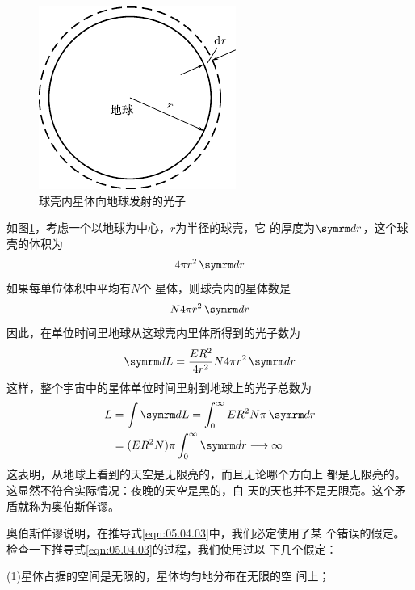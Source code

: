 \begin{figure}
    \centering
    \vspace{-2.5em}
    \includegraphics{figure/fig05.03}
    \caption{球壳内星体向地球发射的光子}
    \label{fig:05.03}
\end{figure}
如图\ref{fig:05.03}，考虑一个以地球为中心，$ r $为半径的球壳，它
的厚度为$ \dif r $，这个球壳的体积为
\begin{equation*}
    4 \pi r ^ { 2 } \dif r
\end{equation*}%
如果每单位体积中平均有$ N $个
星体，则球壳内的星体数是
\begin{equation}\label{eqn:05.04.02}
    N  4  \pi r ^ { 2 } \dif r
\end{equation}
因此，在单位时间里地球从这球壳内里体所得到的光子数为
\begin{equation*}
    \dif L = \frac { E R ^ { 2 } } { 4 r ^ { 2 } } N 4 \pi r ^ { 2 } \dif r
\end{equation*}
这样，整个宇宙中的星体单位时间里射到地球上的光子总数为
\begin{equation}\label{eqn:05.04.03}
    \begin{aligned}
    L &= \int \dif L = \int _ 0 ^ { \infty } { E R ^ { 2 } N \pi \dif r } \\
      &= ( E R ^ { 2 } N ) \pi \int _ 0 ^ { \infty } \dif r \longrightarrow \infty
    \end{aligned}
\end{equation}
这表明，从地球上看到的天空是无限亮的，而且无论哪个方向上
都是无限亮的。这显然不符合实际情况：夜晚的天空是黑的，白
天的天也并不是无限亮。这个矛盾就称为奥伯斯佯谬。

奥伯斯佯谬说明，在推导式\eqref{eqn:05.04.03}中，我们必定使用了某
个错误的假定。检查一下推导式\eqref{eqn:05.04.03}的过程，我们使用过以
下几个假定：

(1)星体占据的空间是无限的，星体均匀地分布在无限的空
间上；

